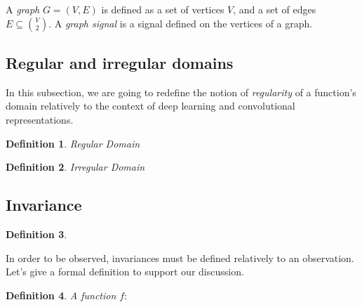 \documentclass{article}
\newtheorem{definition}{Definition}
\begin{document}
\begin{figure}

\end{figure}

A \emph{graph} $G = (V, E)$ is defined as a set of vertices $V$, and a set of edges $E \subseteq\binom{V}{2}$.
A \emph{graph signal} is a signal defined on the vertices of a graph.


\subsection*{Regular and irregular domains}

In this subsection, we are going to redefine the notion of \emph{regularity} of a function's domain relatively to the context of deep learning and convolutional representations.



\begin{definition}{Regular Domain}\\
\end{definition}


\begin{definition}{Irregular Domain}\\

\end{definition}


\subsection*{Invariance}

\begin{definition}

\end{definition}

In order to be observed, invariances must be defined relatively to an observation. Let's give a formal definition to support our discussion.



\begin{definition}{A function $f: $}

\end{definition}
\end{document}
